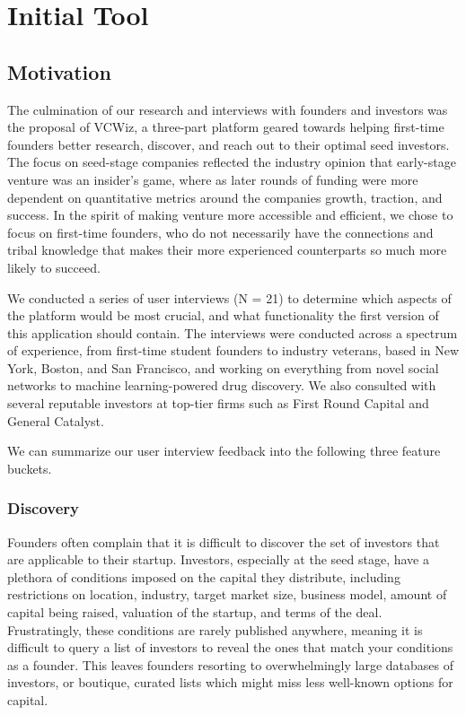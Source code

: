 \chapter{Initial Tool}

\section{Motivation}

The culmination of our research and interviews with founders and investors was the proposal of VCWiz, a three-part platform geared towards helping first-time founders better research, discover, and reach out to their optimal seed investors. The focus on seed-stage companies reflected the industry opinion that early-stage venture was an insider's game, where as later rounds of funding were more dependent on quantitative metrics around the companies growth, traction, and success. In the spirit of making venture more accessible and efficient, we chose to focus on first-time founders, who do not necessarily have the connections and tribal knowledge that makes their more experienced counterparts so much more likely to succeed.

We conducted a series of user interviews (N = 21) to determine which aspects of the platform would be most crucial, and what functionality the first version of this application should contain. The interviews were conducted across a spectrum of experience, from first-time student founders to industry veterans, based in New York, Boston, and San Francisco, and working on everything from novel social networks to machine learning-powered drug discovery. We also consulted with several reputable investors at top-tier firms such as First Round Capital and General Catalyst.

We can summarize our user interview feedback into the following three feature buckets.

\subsection{Discovery}

Founders often complain that it is difficult to discover the set of investors that are applicable to their startup. Investors, especially at the seed stage, have a plethora of conditions imposed on the capital they distribute, including restrictions on location, industry, target market size, business model, amount of capital being raised, valuation of the startup, and terms of the deal. Frustratingly, these conditions are rarely published anywhere, meaning it is difficult to query a list of investors to reveal the ones that match your conditions as a founder. This leaves founders resorting to overwhelmingly large databases of investors, or boutique, curated lists which might miss less well-known options for capital.

